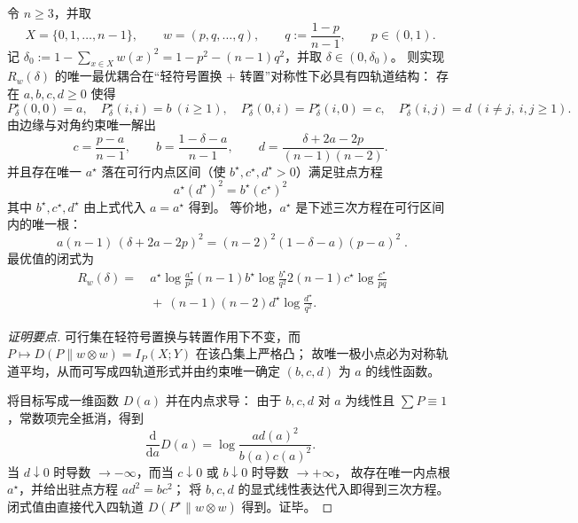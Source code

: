 
\begin{theorem}\label{thm:pom-diagonal-rate-two-orbit-heavy-light-cubic}
令 \(n\ge 3\)，并取
\[
X=\{0,1,\dots,n-1\},\qquad
w=(p,q,\dots,q),\qquad
q:=\frac{1-p}{n-1},\qquad p\in(0,1).
\]
记
\(
\delta_0:=1-\sum_{x\in X}w(x)^2=1-p^2-(n-1)q^2
\)，并取 \(\delta\in(0,\delta_0)\)。
则实现 \(R_w(\delta)\) 的唯一最优耦合在“轻符号置换 + 转置”对称性下必具有四轨道结构：
存在 \(a,b,c,d\ge 0\) 使得
\[
P^\star_\delta(0,0)=a,\quad
P^\star_\delta(i,i)=b\ (i\ge 1),\quad
P^\star_\delta(0,i)=P^\star_\delta(i,0)=c,\quad
P^\star_\delta(i,j)=d\ (i\ne j,\ i,j\ge 1).
\]
由边缘与对角约束唯一解出
\[
c=\frac{p-a}{n-1},\qquad
b=\frac{1-\delta-a}{n-1},\qquad
d=\frac{\delta+2a-2p}{(n-1)(n-2)}.
\]
并且存在唯一 \(a^\star\) 落在可行内点区间（使 \(b^\star,c^\star,d^\star>0\)）满足驻点方程
\[
\boxed{\;
a^\star(d^\star)^2=b^\star(c^\star)^2\;}
\]
其中 \(b^\star,c^\star,d^\star\) 由上式代入 \(a=a^\star\) 得到。
等价地，\(a^\star\) 是下述三次方程在可行区间内的唯一根：
\[
\boxed{\;
a(n-1)\,(\delta+2a-2p)^2=(n-2)^2(1-\delta-a)(p-a)^2\; }.
\]
最优值的闭式为
\[
\boxed{\;
\begin{aligned}
R_w(\delta)=&
\ a^\star\log\frac{a^\star}{p^2}
(n-1)b^\star\log\frac{b^\star}{q^2}
2(n-1)c^\star\log\frac{c^\star}{pq}\\
&\ +\ (n-1)(n-2)d^\star\log\frac{d^\star}{q^2}.
\end{aligned}}
\]
\end{theorem}
\begin{proof}[证明要点]
可行集在轻符号置换与转置作用下不变，而 \(P\mapsto D(P\|w\otimes w)=I_P(X;Y)\) 在该凸集上严格凸；
故唯一极小点必为对称轨道平均，从而可写成四轨道形式并由约束唯一确定 \((b,c,d)\) 为 \(a\) 的线性函数。
\par
将目标写成一维函数 \(D(a)\) 并在内点求导：
由于 \(b,c,d\) 对 \(a\) 为线性且 \(\sum P\equiv 1\)，常数项完全抵消，得到
\[
\frac{\mathrm d}{\mathrm d a}D(a)=\log\frac{a d(a)^2}{b(a)c(a)^2}.
\]
当 \(d\downarrow 0\) 时导数 \(\to-\infty\)，而当 \(c\downarrow 0\) 或 \(b\downarrow 0\) 时导数 \(\to+\infty\)，
故存在唯一内点根 \(a^\star\)，并给出驻点方程 \(ad^2=bc^2\)；
将 \(b,c,d\) 的显式线性表达代入即得到三次方程。
闭式值由直接代入四轨道 \(D(P^\star\|w\otimes w)\) 得到。证毕。
\end{proof}

